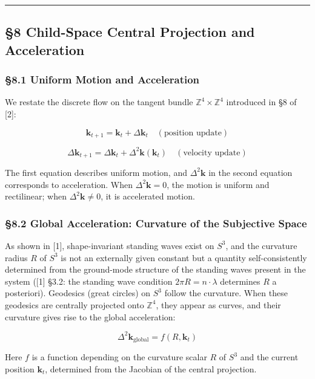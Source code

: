 \documentclass[
  a4paper,11pt]{article}
\theoremstyle{definition}
\theoremstyle{remark}
\begin{document}
\begin{center}\rule{0.5\linewidth}{0.5pt}\end{center}

\subsection{§8 Child-Space Central Projection and
Acceleration}\label{child-space-central-projection-and-acceleration}

\subsubsection{§8.1 Uniform Motion and
Acceleration}\label{uniform-motion-and-acceleration}

We restate the discrete flow on the tangent bundle
\(\mathbb{Z}^4 \times \mathbb{Z}^4\) introduced in §8 of {[}2{]}:

\[\mathbf{k}_{t+1} = \mathbf{k}_t + \Delta\mathbf{k}_t \quad (\text{position update})\]

\[\Delta\mathbf{k}_{t+1} = \Delta\mathbf{k}_t + \Delta^2\mathbf{k}(\mathbf{k}_t) \quad (\text{velocity update})\]

The first equation describes uniform motion, and \(\Delta^2\mathbf{k}\)
in the second equation corresponds to acceleration. When
\(\Delta^2\mathbf{k} = 0\), the motion is uniform and rectilinear; when
\(\Delta^2\mathbf{k} \neq 0\), it is accelerated motion.

\subsubsection{§8.2 Global Acceleration: Curvature of the Subjective
Space}\label{global-acceleration-curvature-of-the-subjective-space}

As shown in {[}1{]}, shape-invariant standing waves exist on \(S^3\),
and the curvature radius \(R\) of \(S^3\) is not an externally given
constant but a quantity self-consistently determined from the
ground-mode structure of the standing waves present in the system
({[}1{]} §3.2: the standing wave condition \(2\pi R = n \cdot \lambda\)
determines \(R\) a posteriori). Geodesics (great circles) on \(S^3\)
follow the curvature. When these geodesics are centrally projected onto
\(\mathbb{Z}^4\), they appear as curves, and their curvature gives rise
to the global acceleration:

\[\Delta^2\mathbf{k}_{\text{global}} = f(R, \mathbf{k}_t)\]

Here \(f\) is a function depending on the curvature scalar \(R\) of
\(S^3\) and the current position \(\mathbf{k}_t\), determined from the
Jacobian of the central projection.
\end{document}
